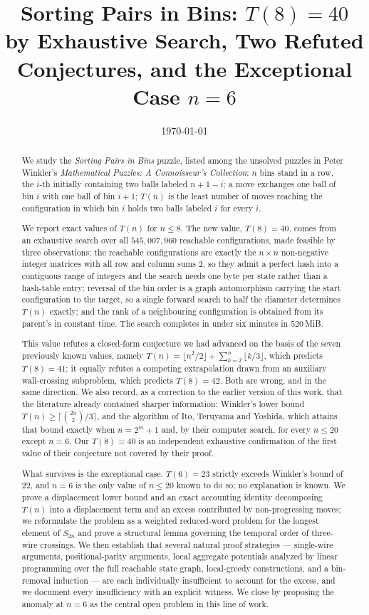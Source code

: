 \documentclass[11pt]{amsart}
\title[Sorting Pairs in Bins]{Sorting Pairs in Bins: $T(8)=40$ by Exhaustive Search, Two Refuted Conjectures, and the Exceptional Case $n=6$}
\author{}
\date{\today}
\theoremstyle{plain}
\theoremstyle{definition}
\theoremstyle{remark}
\begin{document}
\begin{abstract}
We study the \emph{Sorting Pairs in Bins} puzzle, listed among the unsolved puzzles in Peter Winkler's \emph{Mathematical Puzzles: A Connoisseur's Collection}: $n$ bins stand in a row, the $i$-th initially containing two balls labeled $n+1-i$; a move exchanges one ball of bin $i$ with one ball of bin $i+1$; $T(n)$ is the least number of moves reaching the configuration in which bin $i$ holds two balls labeled $i$ for every $i$.

We report exact values of $T(n)$ for $n\le 8$. The new value, $T(8)=40$, comes from an exhaustive search over all $545{,}007{,}960$ reachable configurations, made feasible by three observations: the reachable configurations are exactly the $n\times n$ non-negative integer matrices with all row and column sums $2$, so they admit a perfect hash into a contiguous range of integers and the search needs one byte per state rather than a hash-table entry; reversal of the bin order is a graph automorphism carrying the start configuration to the target, so a single forward search to half the diameter determines $T(n)$ exactly; and the rank of a neighbouring configuration is obtained from its parent's in constant time. The search completes in under six minutes in $520$\,MiB.

This value refutes a closed-form conjecture we had advanced on the basis of the seven previously known values, namely $T(n)=\lfloor n^2/2\rfloor+\sum_{k=2}^{n}\lfloor k/3\rfloor$, which predicts $T(8)=41$; it equally refutes a competing extrapolation drawn from an auxiliary wall-crossing subproblem, which predicts $T(8)=42$. Both are wrong, and in the same direction. We also record, as a correction to the earlier version of this work, that the literature already contained sharper information: Winkler's lower bound $T(n)\ge\lceil\binom{2n}{2}/3\rceil$, and the algorithm of Ito, Teruyama and Yoshida, which attains that bound exactly when $n=2^m+1$ and, by their computer search, for every $n\le 20$ except $n=6$. Our $T(8)=40$ is an independent exhaustive confirmation of the first value of their conjecture not covered by their proof.

What survives is the exceptional case. $T(6)=23$ strictly exceeds Winkler's bound of $22$, and $n=6$ is the only value of $n\le 20$ known to do so; no explanation is known. We prove a displacement lower bound and an exact accounting identity decomposing $T(n)$ into a displacement term and an excess contributed by non-progressing moves; we reformulate the problem as a weighted reduced-word problem for the longest element of $S_{2n}$ and prove a structural lemma governing the temporal order of three-wire crossings. We then establish that several natural proof strategies --- single-wire arguments, positional-parity arguments, local aggregate potentials analyzed by linear programming over the full reachable state graph, local-greedy constructions, and a bin-removal induction --- are each individually insufficient to account for the excess, and we document every insufficiency with an explicit witness. We close by proposing the anomaly at $n=6$ as the central open problem in this line of work.
\end{abstract}
\end{document}
